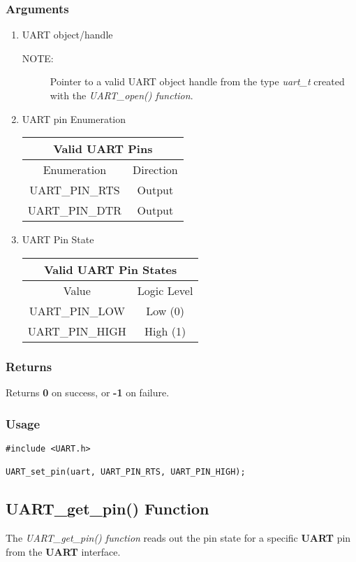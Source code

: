 \documentclass{report}
\begin{document}
\subsubsection*{Arguments}
\begin{enumerate}
\item UART object/handle
\begin{description}
\item[NOTE:] Pointer to a valid UART object handle from the type \textit{uart\_t}
created with the \textit{UART\_open() function}.
\end{description}
\item UART pin Enumeration
\newline
\newline
\begin{tabular}{| c | c |}
\hline
\multicolumn{2}{|c|}{Valid UART Pins} \\
\hline
Enumeration & Direction \\
\hline
UART\_PIN\_RTS & Output \\
UART\_PIN\_DTR & Output \\
\hline
\end{tabular}
\item UART Pin State
\newline
\newline
\begin{tabular}{| c | c |}
\hline
\multicolumn{2}{|c|}{Valid UART Pin States} \\
\hline
Value & Logic Level \\
\hline
UART\_PIN\_LOW & Low (0) \\
UART\_PIN\_HIGH & High (1) \\
\hline
\end{tabular}
\end{enumerate}
\subsubsection*{Returns}
Returns \textbf{0} on success, or \textbf{-1} on failure.
\subsubsection*{Usage}
\begin{lstlisting}
#include <UART.h>

UART_set_pin(uart, UART_PIN_RTS, UART_PIN_HIGH);
\end{lstlisting}
\subsection{UART\_get\_pin() Function}
The \textit{UART\_get\_pin() function} reads out the pin state for a
specific \textbf{UART} pin from the \textbf{UART} interface.
\end{document}
